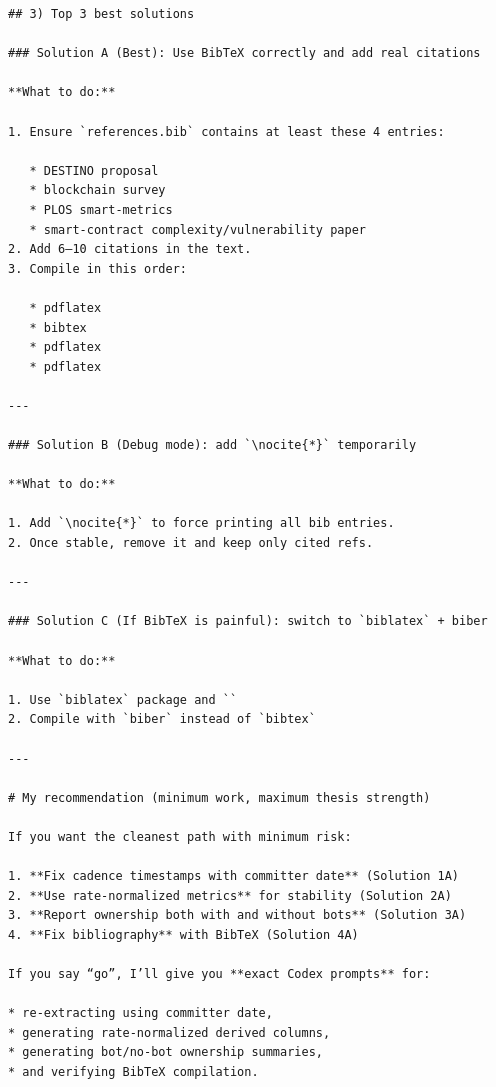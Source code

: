 \documentclass[11pt,a4paper]{article}
\begin{document}
\begin{verbatim}
## 3) Top 3 best solutions

### Solution A (Best): Use BibTeX correctly and add real citations

**What to do:**

1. Ensure `references.bib` contains at least these 4 entries:

   * DESTINO proposal
   * blockchain survey
   * PLOS smart-metrics
   * smart-contract complexity/vulnerability paper
2. Add 6–10 citations in the text.
3. Compile in this order:

   * pdflatex
   * bibtex
   * pdflatex
   * pdflatex

---

### Solution B (Debug mode): add `\nocite{*}` temporarily

**What to do:**

1. Add `\nocite{*}` to force printing all bib entries.
2. Once stable, remove it and keep only cited refs.

---

### Solution C (If BibTeX is painful): switch to `biblatex` + biber

**What to do:**

1. Use `biblatex` package and ``
2. Compile with `biber` instead of `bibtex`

---

# My recommendation (minimum work, maximum thesis strength)

If you want the cleanest path with minimum risk:

1. **Fix cadence timestamps with committer date** (Solution 1A)
2. **Use rate-normalized metrics** for stability (Solution 2A)
3. **Report ownership both with and without bots** (Solution 3A)
4. **Fix bibliography** with BibTeX (Solution 4A)

If you say “go”, I’ll give you **exact Codex prompts** for:

* re-extracting using committer date,
* generating rate-normalized derived columns,
* generating bot/no-bot ownership summaries,
* and verifying BibTeX compilation.
\end{verbatim}
\end{document}
